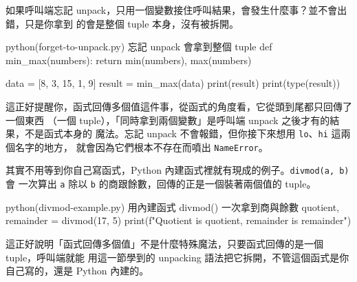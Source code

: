 
如果呼叫端忘記 unpack，只用一個變數接住呼叫結果，會發生什麼事？並不會出錯，只是你拿到
的會是整個 tuple 本身，沒有被拆開。

\begin{example}{python}{(forget-to-unpack.py) 忘記 unpack 會拿到整個 tuple}
def min_max(numbers):
    return min(numbers), max(numbers)


data = [8, 3, 15, 1, 9]
result = min_max(data)
print(result)
print(type(result))
\end{example}


這正好提醒你，函式回傳多個值這件事，從函式的角度看，它從頭到尾都只回傳了一個東西
（一個 tuple），「同時拿到兩個變數」是呼叫端 unpack 之後才有的結果，不是函式本身的
魔法。忘記 unpack 不會報錯，但你接下來想用 \texttt{lo}、\texttt{hi} 這兩個名字的地方，
就會因為它們根本不存在而噴出 \texttt{NameError}。

其實不用等到你自己寫函式，Python 內建函式裡就有現成的例子。\texttt{divmod(a, b)} 會
一次算出 \texttt{a} 除以 \texttt{b} 的商跟餘數，回傳的正是一個裝著兩個值的 tuple。

\begin{example}{python}{(divmod-example.py) 用內建函式 divmod() 一次拿到商與餘數}
quotient, remainder = divmod(17, 5)
print(f"Quotient is {quotient}, remainder is {remainder}")
\end{example}


這正好說明「函式回傳多個值」不是什麼特殊魔法，只要函式回傳的是一個 tuple，呼叫端就能
用這一節學到的 unpacking 語法把它拆開，不管這個函式是你自己寫的，還是 Python 內建的。

